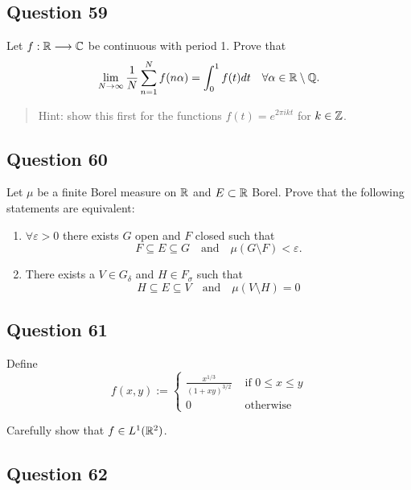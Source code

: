 \documentclass[12pt]{article}
\providecommand{\tightlist}{%
  \setlength{\itemsep}{0pt}\setlength{\parskip}{0pt}}
\begin{document}
\hypertarget{question-59-1}{%
\subsection{Question 59}\label{question-59-1}}

Let \(f: {\mathbb{R}} \longrightarrow {\mathbb{C}}\) be continuous with period 1. Prove that \[
\lim _{N \rightarrow \infty} \frac{1}{N} \sum_{n=1}^{N} f(n \alpha)=\int_{0}^{1} f(t) d t \quad \forall \alpha \in {\mathbb{R}}\setminus{\mathbb{Q}}.
\]

\begin{quote}
Hint: show this first for the functions \(f(t) = e^{2\pi i k t}\) for
\(k\in {\mathbb{Z}}\).
\end{quote}

\hypertarget{question-60-1}{%
\subsection{Question 60}\label{question-60-1}}

Let \(\mu\) be a finite Borel measure on \({\mathbb{R}}\) and \(E \subset {\mathbb{R}}\)
Borel. Prove that the following statements are equivalent:

\begin{enumerate}
\def\labelenumi{\arabic{enumi}.}
\tightlist
\item
  \(\forall \varepsilon > 0\) there exists \(G\) open and \(F\) closed
  such that \[
  F \subseteq E \subseteq G \quad \text{and} \quad \mu(G\setminus F) < \varepsilon.
  \]
\item
  There exists a \(V \in G_\delta\) and \(H \in F_\sigma\) such that \[
  H \subseteq E \subseteq V \quad \text{and}\quad \mu(V\setminus H) = 0
  \]
\end{enumerate}

\hypertarget{question-61-1}{%
\subsection{Question 61}\label{question-61-1}}

Define \[
f(x, y):=\left\{\begin{array}{ll}{\frac{x^{1 / 3}}{(1+x y)^{3 / 2}}} & {\text { if } 0 \leq x \leq y} \\ {0} & {\text { otherwise }}\end{array}\right.
\]

Carefully show that \(f \in L^1({\mathbb{R}}^2)\).

\hypertarget{question-62-1}{%
\subsection{Question 62}\label{question-62-1}}
\end{document}
